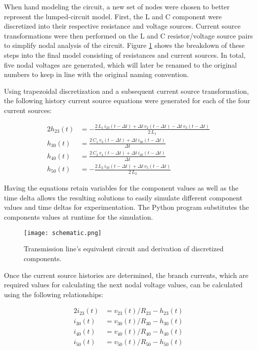 \documentclass[10pt, oneside, letterpaper]{article}
\begin{document}
When hand modeling the circuit, a new set of nodes were chosen to better represent the lumped-circuit model. First, the L and C component were discretized into their respective resistance and voltage sources. Current source transformations were then performed on the L and C resistor/voltage source pairs to simplify nodal analysis of the circuit. Figure \ref{hand-setup} shows the breakdown of these steps into the final model consisting of resistances and current sources. In total, five nodal voltages are generated, which will later be renamed to the original numbers to keep in line with the original naming convention.

Using trapezoidal discretization and a subsequent current source transformation, the following history current source equations were generated for each of the four current sources:

\begin{alignat}{2}
h_{23}(t) &= -\frac{2\,L_{1}\,i_{23}(t - \Delta{}t)+\Delta{}t\,v_{2}(t - \Delta{}t)-\Delta{}t\,v_{3}(t - \Delta{}t)}{2\,L_{1}}\\
h_{30}(t) &= \frac{2\,C_{1}\,v_{3}(t - \Delta{}t)+\Delta{}t\,i_{30}(t - \Delta{}t)}{\Delta{}t}\\ 
h_{40}(t) &= \frac{2\,C_{2}\,v_{4}(t - \Delta{}t)+\Delta{}t\,i_{40}(t - \Delta{}t)}{\Delta{}t}\\ 
h_{50}(t) &= -\frac{2\,L_{2}\,i_{50}(t - \Delta{}t)+\Delta{}t\,v_{5}(t - \Delta{}t)}{2\,L_{2}}
\end{alignat}

Having the equations retain variables for the component values as well as the time delta allows the resulting solutions to easily simulate different component values and time deltas for experimentation. The Python program substitutes the components values at runtime for the simulation.

\begin{figure}[H]
\centering
\texttt{[image: schematic.png]}
\caption{Transmission line's equivalent circuit and derivation of discretized components.}
\label{hand-setup}
\end{figure}

Once the current source histories are determined, the branch currents, which are required values for calculating the next nodal voltage values, can be calculated using the following relationships:

\begin{alignat}{2}
i_{23}(t) &= v_{23}(t)/R_{23} - h_{23}(t) \\
i_{30}(t) &= v_{30}(t)/R_{30} - h_{30}(t) \\
i_{40}(t) &= v_{40}(t)/R_{40} - h_{40}(t) \\
i_{50}(t) &= v_{50}(t)/R_{50} - h_{50}(t)
\end{alignat}
\end{document}
